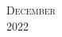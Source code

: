 \documentclass[10pt]{article}
\begin{document}
\begin{calendar}{\textwidth}



\finishCalendar
\end{calendar}

\clearpage

\begin{center}
	\textsc{\LARGE December}\\ %
	\textsc{\large 2022} %
\end{center}

\end{document}
